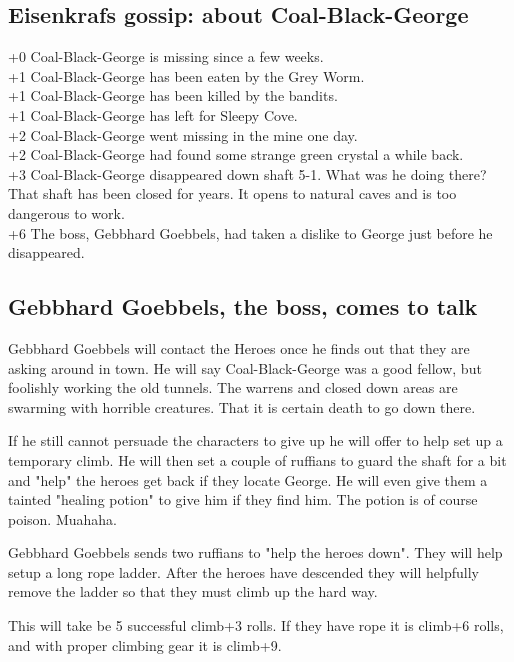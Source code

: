 \documentclass[11pt, twoside, titlepage, a4paper]{report}
\begin{document}
\subsection*{Eisenkrafs gossip: about Coal-Black-George}
+0 Coal-Black-George is missing since a few weeks. \\
+1 Coal-Black-George has been eaten by the Grey Worm. \\
+1 Coal-Black-George has been killed by the bandits. \\
+1 Coal-Black-George has left for Sleepy Cove. \\
+2 Coal-Black-George went missing in the mine one day. \\
+2 Coal-Black-George had found some strange green crystal a while back. \\
+3 Coal-Black-George disappeared down shaft 5-1. What was he doing there? That shaft has been closed for years. It opens to natural caves and is too dangerous to work. \\
+6 The boss, Gebbhard Goebbels, had taken a dislike to George just before he disappeared.


\subsection*{Gebbhard Goebbels, the boss, comes to talk}
Gebbhard Goebbels will contact the Heroes once he finds out that they are asking around in town. He will say Coal-Black-George was a good fellow, but foolishly working the old tunnels. The warrens and closed down areas are swarming with horrible creatures. That it is certain death to go down there.

If he still cannot persuade the characters to give up he will offer to help set up a temporary climb. He will then set a couple of ruffians to guard the shaft for a bit and "help" the heroes get back if they locate George. He will even give them a tainted "healing potion" to give him if they find him. The potion is of course poison. Muahaha.

Gebbhard Goebbels sends two ruffians to "help the heroes down". They will help setup a long rope ladder. After the heroes have descended they will helpfully remove the ladder so that they must climb up the hard way.

This will take be 5 successful climb+3 rolls. If they have rope it is climb+6 rolls, and with proper climbing gear it is climb+9.
\end{document}
